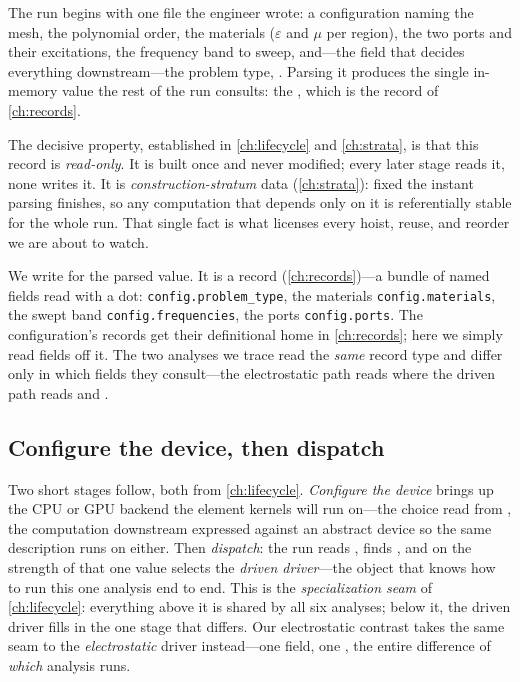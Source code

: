 The run begins with one file the engineer wrote: a configuration naming the mesh,
the polynomial order, the materials ($\varepsilon$ and $\mu$ per region), the two
ports and their excitations, the frequency band to sweep, and---the field that
decides everything downstream---the problem type, . Parsing it
produces the single in-memory value the rest of the run consults: the
, which is the  record of \cref{ch:records}.

The decisive property, established in \cref{ch:lifecycle} and \cref{ch:strata}, is
that this record is \emph{read-only}. It is built once and never modified; every
later stage reads it, none writes it. It is \emph{construction-stratum} data
(\cref{ch:strata}): fixed the instant parsing finishes, so any computation that
depends only on it is referentially stable for the whole run. That single fact is
what licenses every hoist, reuse, and reorder we are about to watch.

\begin{notationbox}
We write  for the parsed  value. It is a record
(\cref{ch:records})---a bundle of named fields read with a dot:
\lstinline[style=l4style]|config.problem_type|, the materials
\lstinline[style=l4style]|config.materials|, the swept band
\lstinline[style=l4style]|config.frequencies|, the ports
\lstinline[style=l4style]|config.ports|. The configuration's records get their
definitional home in \cref{ch:records}; here we simply read fields off it. The
two analyses we trace read the \emph{same} record type and differ only in which
fields they consult---the electrostatic path reads  where
the driven path reads  and .
\end{notationbox}

\subsection{Configure the device, then dispatch}

Two short stages follow, both from \cref{ch:lifecycle}. \emph{Configure the
device} brings up the CPU or GPU backend the element kernels will run on---the
choice read from , the computation downstream expressed against an
abstract device so the same description runs on either. Then \emph{dispatch}: the
run reads , finds , and on the strength of
that one value selects the \emph{driven driver}---the object that knows how to run
this one analysis end to end. This is the \emph{specialization seam} of
\cref{ch:lifecycle}: everything above it is shared by all six analyses; below it,
the driven driver fills in the one stage that differs. Our electrostatic contrast
takes the same seam to the \emph{electrostatic} driver instead---one field, one
, the entire difference of \emph{which} analysis runs.


